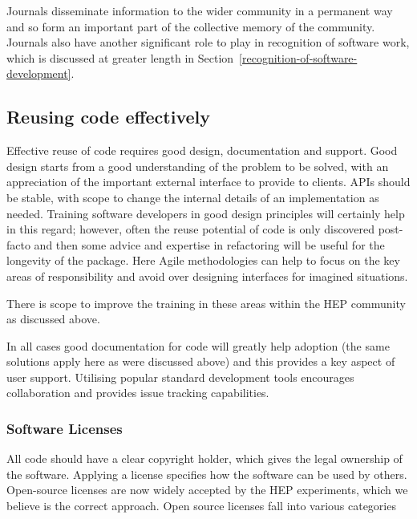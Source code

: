 \documentclass[12pt,a4paper]{article}
\begin{document}
Journals disseminate information to the wider community in a
permanent way and so form an important part of the collective memory of the
community. Journals also have another significant role to play
in recognition of software work, which is discussed at greater length in
Section~\ref{recognition-of-software-development}.


\hypertarget{reusing-code-effectively}{%
\subsection{Reusing code effectively}\label{reusing-code-effectively}}

Effective reuse of code requires good design, documentation and support.
Good design starts from a good understanding of the problem to be
solved, with an appreciation of the important external interface to
provide to clients. APIs should be stable, with scope to change the internal
details of an implementation as needed. Training software developers in
good design principles will certainly help in this regard; however,
often the reuse potential of code is only discovered post-facto and then some
advice and expertise in refactoring will be useful for the longevity of
the package. Here Agile methodologies can help to focus on the key areas
of responsibility and avoid over designing interfaces for imagined
situations.

There is scope to improve the training in these areas within the HEP
community as discussed above.

In all cases good documentation for code will greatly help adoption (the
same solutions apply here as were discussed above) and this provides a
key aspect of user support. Utilising popular standard development
tools encourages collaboration and provides issue tracking capabilities.

\hypertarget{software-licenses}{%
\subsubsection{Software Licenses}\label{software-licenses}}

All code should have a clear copyright holder, which gives the legal
ownership of the software. Applying a license specifies how the software
can be used by others. Open-source licenses are now widely accepted by
the HEP experiments, which we believe is the correct approach. Open
source licenses fall into various categories
\end{document}
